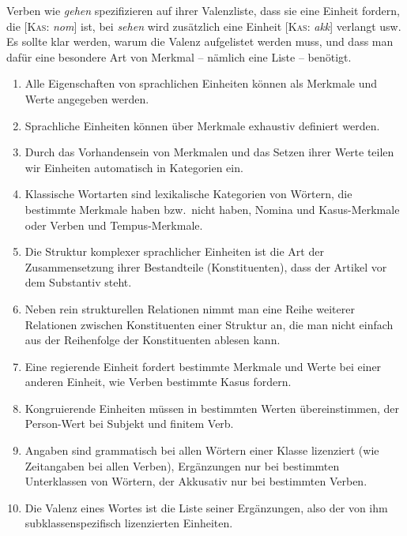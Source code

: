 Verben wie \textit{gehen} spezifizieren auf ihrer Valenzliste, dass sie eine Einheit fordern, die [\textsc{Kas}: \textit{nom}] ist, bei \textit{sehen} wird zusätzlich eine Einheit [\textsc{Kas}: \textit{akk}] verlangt usw.
Es sollte klar werden, warum die Valenz aufgelistet werden muss, und dass man dafür eine besondere Art von Merkmal -- nämlich eine Liste -- benötigt.

\Zusammenfassung

\begin{enumerate}\Lf
  \item Alle Eigenschaften von sprachlichen Einheiten können als Merkmale und Werte angegeben werden.
  \item Sprachliche Einheiten können über Merkmale exhaustiv definiert werden.
  \item Durch das Vorhandensein von Merkmalen und das Setzen ihrer Werte teilen wir Einheiten automatisch in Kategorien ein.
  \item Klassische Wortarten sind lexikalische Kategorien von Wörtern, die bestimmte Merkmale haben bzw.\ nicht haben, \zB Nomina und Kasus-Merk\-male oder Verben und Tempus-Merk\-male.
  \item Die Struktur komplexer sprachlicher Einheiten ist die Art der Zusammensetzung ihrer Bestandteile (Konstituenten), \zB dass der Artikel vor dem Substantiv steht.
  \item Neben rein strukturellen Relationen nimmt man eine Reihe weiterer Relationen zwischen Konstituenten einer Struktur an, die man nicht einfach aus der Reihenfolge der Konstituenten ablesen kann.
  \item Eine regierende Einheit fordert bestimmte Merkmale und Werte bei einer anderen Einheit, wie \zB Verben bestimmte Kasus fordern.
  \item Kongruierende Einheiten müssen in bestimmten Werten übereinstimmen, \zB der Person-Wert bei Subjekt und finitem Verb.
  \item Angaben sind grammatisch bei allen Wörtern einer Klasse lizenziert (wie \zB Zeitangaben bei allen Verben), Ergänzungen nur bei bestimmten Unterklassen von Wörtern, \zB der Akkusativ nur bei bestimmten Verben.
  \item Die Valenz eines Wortes ist die Liste seiner Ergänzungen, also der von ihm subklassenspezifisch lizenzierten Einheiten.
\end{enumerate}

\WeitereLiteratur

